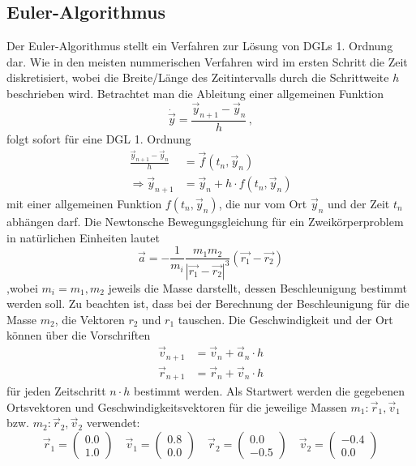 \subsection{Euler-Algorithmus}
Der Euler-Algorithmus stellt ein Verfahren zur Lösung von DGLs 1. Ordnung dar.
Wie in den meisten nummerischen Verfahren wird im ersten Schritt die Zeit diskretisiert, wobei die Breite/Länge des Zeitintervalls durch die Schrittweite $h$ beschrieben wird.
Betrachtet man die Ableitung einer allgemeinen Funktion
\begin{equation*}
    \dot{\vec{y}} = \frac{\vec{y}_{n+1} - \vec{y}_n}{h} \, ,
\end{equation*}
folgt sofort für eine DGL 1. Ordnung
\begin{align*}
    \frac{\vec{y}_{n+1} - \vec{y}_n}{h} &= \vec{f}(t_n, \vec{y}_n) \\
    \Rightarrow \vec{y}_{n+1} &= \vec{y}_{n} + h \cdot f(t_n, \vec{y}_{n})
\end{align*}
mit einer allgemeinen Funktion $f(t_n, \vec{y}_{n})$, die nur vom Ort $\vec{y}_{n}$ und der Zeit $t_n$ abhängen darf.
Die Newtonsche Bewegungsgleichung für ein Zweikörperproblem in natürlichen Einheiten lautet
\begin{equation}
    \vec{a} = -\frac{1}{m_i} \frac{m_1 m_2}{|\vec{r_1} - \vec{r_2}|^3} (\vec{r_1} - \vec{r_2})
\end{equation}
,wobei $m_i = m_1, m_2$ jeweils die Masse darstellt, dessen Beschleunigung bestimmt werden soll.
Zu beachten ist, dass bei der Berechnung der Beschleunigung für die Masse $m_2$, die Vektoren $r_2$ und $r_1$ tauschen.
Die Geschwindigkeit und der Ort können über die Vorschriften
\begin{align}
    \vec{v}_{n+1} &= \vec{v}_n + \vec{a}_n \cdot h \\
    \vec{r}_{n+1} &= \vec{r}_n + \vec{v}_n \cdot h
\end{align}
für jeden Zeitschritt $n\cdot h$ bestimmt werden.
Als Startwert werden die gegebenen Ortsvektoren und Geschwindigkeitsvektoren für die jeweilige Massen $m_1: \vec{r}_1, \vec{v}_1$ bzw. $m_2: \vec{r}_2, \vec{v}_2$ verwendet:
\begin{equation}
    \vec{r}_1 = \begin{pmatrix} 0.0\\ 1.0\end{pmatrix}
    \quad
    \vec{v}_1 = \begin{pmatrix} 0.8\\ 0.0\end{pmatrix}
    \quad
    \vec{r}_2 = \begin{pmatrix} 0.0\\ -0.5\end{pmatrix}
    \quad
    \vec{v}_2 = \begin{pmatrix} -0.4\\ 0.0\end{pmatrix}
\end{equation}

